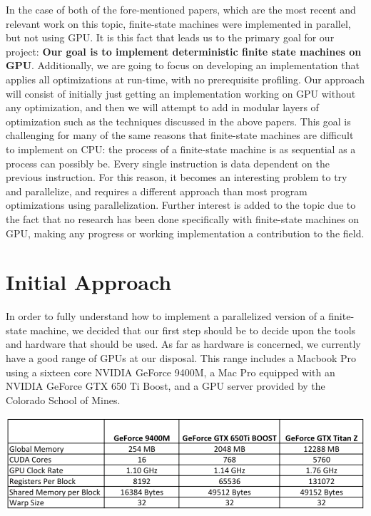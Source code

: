 \documentclass[11pt]{sigplanconf}
\newenvironment{Figure} %
  {\par\medskip\noindent\minipage{\linewidth}}
  {\endminipage\par\medskip}
\begin{document}
In the case of both of the fore-mentioned papers, which are the most recent and relevant work on this topic, finite-state machines were implemented in parallel, but not using GPU. It is this fact that leads us to the primary goal for our project: \textbf{Our goal is to implement deterministic finite state machines on GPU}. Additionally, we are going to focus on developing an implementation that applies all optimizations at run-time, with no prerequisite profiling. Our approach will consist of initially just getting an implementation working on GPU without any optimization, and then we will attempt to add in modular layers of optimization such as the techniques discussed in the above papers. This goal is challenging for many of the same reasons that finite-state machines are difficult to implement on CPU: the process of a finite-state machine is as sequential as a process can possibly be. Every single instruction is data dependent on the previous instruction. For this reason, it becomes an interesting problem to try and parallelize, and requires a different approach than most program optimizations using parallelization. Further interest is added to the topic due to the fact that no research has been done specifically with finite-state machines on GPU, making any progress or working implementation a contribution to the field. 

\section{Initial Approach}

In order to fully understand how to implement a parallelized version of a finite-state machine, we decided that our first step should be to decide upon the tools and hardware that should be used. As far as hardware is concerned, we currently have a good range of GPUs at our disposal. This range includes a Macbook Pro using a sixteen core NVIDIA GeForce 9400M, a Mac Pro equipped with an NVIDIA GeForce GTX 650 Ti Boost, and a GPU server provided by the Colorado School of Mines.

\begin{Figure}
\centering
\includegraphics[width=\linewidth]{gpu_specs.png}
\label{fig:GPU Specifications}
\end{Figure}
\end{document}
